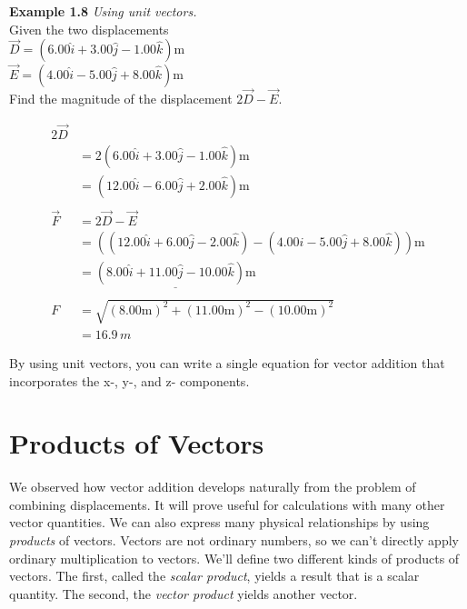 \begin{examplebox}
\textbf{Example 1.8} \textit{Using unit vectors.}\\

Given the two displacements\\
$\overrightarrow{D} = \left(6.00\hat{i} + 3.00\hat{j} - 1.00\hat{k}\right) \text{m}$\\
$\overrightarrow{E} = \left(4.00\hat{i} - 5.00\hat{j} + 8.00\hat{k}\right) \text{m}$\\

Find the magnitude of the displacement $2\overrightarrow{D} - \overrightarrow{E}$.

\begin{mathbox}
\begin{align*}
2\overrightarrow{D}\\
&= 2 \left(6.00\hat{i} + 3.00\hat{j} - 1.00\hat{k}\right) \text{m} \\
&= \left(12.00\hat{i} - 6.00\hat{j} + 2.00\hat{k}\right) \text{m}\\\\
\overrightarrow{F} &= {2\overrightarrow{D}} - \overrightarrow{E} \\
&= \left(\left(12.00\hat{i} + 6.00\hat{j} - 2.00\hat{k}\right) - \left(4.00\hat{i} - 5.00\hat{j} + 8.00\hat{k}\right)\right) \text{m} \\
&= \underline{\left(8.00\hat{i} + 11.00\hat{j} - 10.00\hat{k}\right) \text{m}} \\\\
F &= \sqrt{\left(8.00\text{m}\right)^2 + \left(11.00\text{m}\right)^2 - \left(10.00\text{m}\right)^2} \\
&= 16.9\, m
\end{align*}
\end{mathbox}
\end{examplebox}

\begin{tipbox}
By using unit vectors, you can write a single equation for vector addition that incorporates the x-, y-, and z- components.
\end{tipbox}

\section{Products of Vectors}
We observed how vector addition develops naturally from the problem of combining displacements. It will prove useful for calculations with many other vector quantities. We can also express many physical relationships by using \textit{products} of vectors. Vectors are not ordinary numbers, so we can't directly apply ordinary multiplication to vectors. We'll define two different kinds of products of vectors. The first, called the \textit{scalar product}, yields a result that is a scalar quantity. The second, the \textit{vector product} yields another vector.

